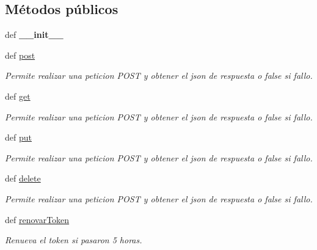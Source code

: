 \subsection*{Métodos públicos}
\begin{DoxyCompactItemize}
\item 
\hypertarget{classsrc_1_1models_1_1conectividad_1_1_conectividad_ac32362e5db32d788fb1bb0bc21b36b6e}{def {\bfseries \-\_\-\-\_\-init\-\_\-\-\_\-}}\label{classsrc_1_1models_1_1conectividad_1_1_conectividad_ac32362e5db32d788fb1bb0bc21b36b6e}

\item 
def \hyperlink{classsrc_1_1models_1_1conectividad_1_1_conectividad_a1c6a08424c9406f4e47bfa4f8deb3bc6}{post}
\begin{DoxyCompactList}\small\item\em Permite realizar una peticion P\-O\-S\-T y obtener el json de respuesta o false si fallo. \end{DoxyCompactList}\item 
def \hyperlink{classsrc_1_1models_1_1conectividad_1_1_conectividad_ac0413d7dd62357ed0c3194a912eab085}{get}
\begin{DoxyCompactList}\small\item\em Permite realizar una peticion P\-O\-S\-T y obtener el json de respuesta o false si fallo. \end{DoxyCompactList}\item 
def \hyperlink{classsrc_1_1models_1_1conectividad_1_1_conectividad_ac093b5f0c19ff3fc5e5ee44eaf0fa54e}{put}
\begin{DoxyCompactList}\small\item\em Permite realizar una peticion P\-O\-S\-T y obtener el json de respuesta o false si fallo. \end{DoxyCompactList}\item 
def \hyperlink{classsrc_1_1models_1_1conectividad_1_1_conectividad_a9b9bbcb408c76c1c051633929d179be3}{delete}
\begin{DoxyCompactList}\small\item\em Permite realizar una peticion P\-O\-S\-T y obtener el json de respuesta o false si fallo. \end{DoxyCompactList}\item 
def \hyperlink{classsrc_1_1models_1_1conectividad_1_1_conectividad_aa728c32ed6b4dded19ce5d7b32638911}{renovar\-Token}
\begin{DoxyCompactList}\small\item\em Renueva el token si pasaron 5 horas. \end{DoxyCompactList}\end{DoxyCompactItemize}
